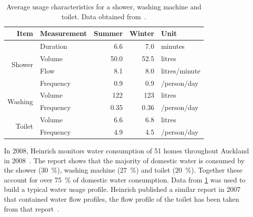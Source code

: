     \begin{table}
      \centering
      \begin{tabular}{r l|r|r|l}
        Item                    & Measurement & Summer & Winter & Unit\\
        \hline\hline
        \multirow{4}{*}{Shower} & Duration    & 6.6    & 7.0    & minutes\\
                                & Volume      & 50.0   & 52.5   & litres\\
                                & Flow        & 8.1    & 8.0    & litres/minute\\
                                & Frequency   & 0.9    & 0.9    & /person/day\\
        \hline
        \multirow{2}{*}{Washing}& Volume      & 122    & 123    & litres\\
                                & Frequency   & 0.35   & 0.36   & /person/day\\
        \hline
        \multirow{2}{*}{Toilet} & Volume      & 6.6    & 6.8    & litres\\
                                & Frequency   & 4.9    & 4.5    & /person/day\\
      \end{tabular}
      \caption{
          \label{tab:consumption_figures}
          Average usage characteristics for a shower, washing machine and toilet.
          Data obtained from~\cite{Heinrich2008}.
      }
    \end{table}

    In 2008, Heinrich monitors water consumption of 51 homes throughout Auckland in 2008~\cite{Heinrich2008}.
    The report shows that the majority of domestic water is consumed by the shower (\SI{30}{\percent}), washing machine (\SI{27}{\percent}) and toilet (\SI{20}{\percent}).
    Together these account for over \SI{75}{\percent} of domestic water consumption.
    Data from \cref{tab:consumption_figures} was used to build a typical water usage profile.
    Heinrich published a similar report in 2007 that contained water flow profiles, the flow profile of the toilet has been taken from that report~\cite{Heinrich2007}.
    
